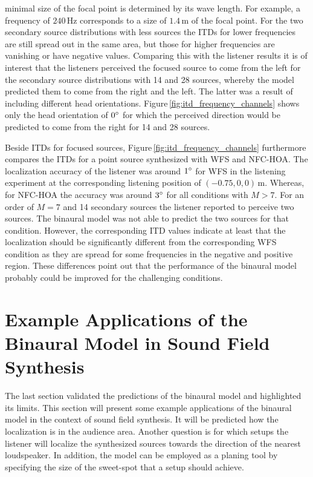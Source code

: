 minimal size of the focal point is determined by its wave length. For example,
a frequency of $240$\,Hz corresponds to a size of $1.4$\,m of the focal
point. For the two secondary source distributions with less sources the
\acp{ITD} for lower frequencies are still spread out in the same area, but those
for higher frequencies are vanishing or have negative values.
Comparing this with the listener results it is of interest that the listeners
perceived the focused source to come from the left for the secondary source
distributions with 14 and 28 sources, whereby the model predicted them to come
from the right and the left. The latter was a result of including different
head orientations. Figure\,\ref{fig:itd_frequency_channels} shows only the head
orientation of $0^\circ$ for which the perceived direction would be predicted
to come from the right for 14 and 28 sources.

Beside \acp{ITD} for focused sources, Figure\,\ref{fig:itd_frequency_channels}
furthermore compares the \acp{ITD} for a point source synthesized with \ac{WFS} and
\ac{NFC-HOA}. The localization accuracy of the listener was around $1^\circ$ for
\ac{WFS} in the listening experiment at the corresponding listening position of
\linebreak
$(-0.75,0,0)$\,m. Whereas, for \ac{NFC-HOA}
the accuracy was around $3^\circ$ for all conditions with $M>7$.
For an order of $M=7$ and 14 secondary sources the listener reported to
perceive two sources. The binaural model was not able to predict the two
sources for that condition. However, the corresponding \ac{ITD} values indicate at least
that the localization should be significantly different from the corresponding
\ac{WFS} condition as they are spread for some frequencies in the negative and
positive region.
These differences point out that the performance of the binaural model probably
could be improved for the challenging conditions.


\section[Example Applications of the Binaural Model]{Example Applications of the
Binaural Model in Sound Field Synthesis}
\label{sec:model_applications}

The last section validated the predictions of the binaural model
and highlighted its limits. This section will present some example applications
of the binaural model in the context of sound field synthesis.
It will be predicted how the localization is in the audience area. Another
question is for which setups the listener will localize the synthesized sources
towards the direction of the nearest loudspeaker.
In addition, the model can be employed as a planing tool by specifying the
size of the sweet-spot that a setup should achieve.

